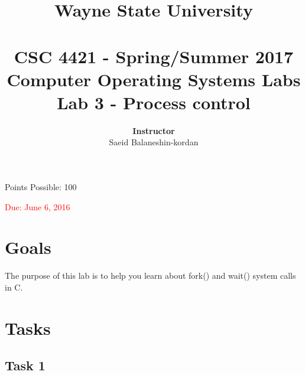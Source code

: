\documentclass[16pt]{article}
\begin{document}
\title{\huge \textbf{Wayne State University \\
 \vline \\
\Huge CSC 4421 - Spring/Summer 2017 \\
 Computer Operating Systems Labs\\
 Lab 3 - Process control}\\
 \vline
 }
\author{\textbf{Instructor}  \vspace{0.2cm} \\ Saeid Balaneshin-kordan\\
}
\date{}
\maketitle

\begin{center}
\Large Points Possible: 100

\textcolor{red}{Due: June 6, 2016}
\end{center}

\section*{Goals}

The purpose of this lab is to help you learn about fork() and wait() system calls in C.

\section*{Tasks}

\subsection*{Task 1}
\end{document}
